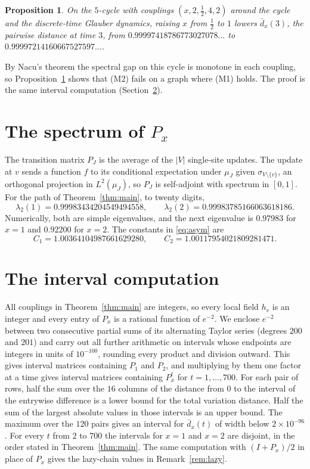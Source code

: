 \documentclass[11pt]{amsart}
\newtheorem{proposition}[theorem]{Proposition}
\theoremstyle{remark}
\newcommand{\dbar}{\bar d}
\begin{document}
\begin{proposition}\label{prop:cycle}
On the $5$-cycle with couplings $(x,2,\tfrac12,4,2)$ around the cycle and the discrete-time Glauber dynamics, raising $x$ from $\tfrac12$ to $1$ lowers $\dbar_x(3)$, the pairwise distance at time $3$, from $0.99997418786773027078\ldots$ to $0.99997214160667527597\ldots$.
\end{proposition}

By Nacu's theorem the spectral gap on this cycle is monotone in each coupling, so Proposition~\ref{prop:cycle} shows that (M2) fails on a graph where (M1) holds. The proof is the same interval computation (Section~\ref{sec:cert}).

\section{The spectrum of \texorpdfstring{$P_x$}{P\_x}}\label{sec:mech}

The transition matrix $P_J$ is the average of the $|V|$ single-site updates. The update at $v$ sends a function $f$ to its conditional expectation under $\mu_J$ given $\sigma_{V\setminus\{v\}}$, an orthogonal projection in $L^2(\mu_J)$, so $P_J$ is self-adjoint with spectrum in $[0,1]$. For the path of Theorem~\ref{thm:main}, to twenty digits,
\[
\lambda_2(1)=0.99983434204549494558,\qquad \lambda_2(2)=0.99983785166063618186.
\]
Numerically, both are simple eigenvalues, and the next eigenvalue is $0.97983$ for $x=1$ and $0.92200$ for $x=2$. The constants in \eqref{eq:asym} are
\[
C_1=1.00364104987661629280,\qquad C_2=1.00117954021809281471.
\]

\section{The interval computation}\label{sec:cert}

All couplings in Theorem~\ref{thm:main} are integers, so every local field $h_v$ is an integer and every entry of $P_x$ is a rational function of $e^{-2}$. We enclose $e^{-2}$ between two consecutive partial sums of its alternating Taylor series (degrees $200$ and $201$) and carry out all further arithmetic on intervals whose endpoints are integers in units of $10^{-100}$, rounding every product and division outward. This gives interval matrices containing $P_1$ and $P_2$, and multiplying by them one factor at a time gives interval matrices containing $P_x^t$ for $t=1,\ldots,700$. For each pair of rows, half the sum over the $16$ columns of the distance from $0$ to the interval of the entrywise difference is a lower bound for the total variation distance. Half the sum of the largest absolute values in those intervals is an upper bound. The maximum over the $120$ pairs gives an interval for $\dbar_x(t)$ of width below $2\times10^{-96}$. For every $t$ from $2$ to $700$ the intervals for $x=1$ and $x=2$ are disjoint, in the order stated in Theorem~\ref{thm:main}. The same computation with $(I+P_x)/2$ in place of $P_x$ gives the lazy-chain values in Remark~\ref{rem:lazy}.
\end{document}
